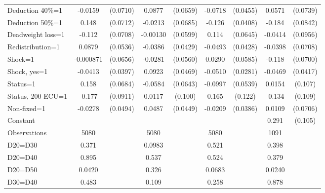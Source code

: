\begin{tabular}{l|cccccc|cc}
Deduction 40\%=1&  -0.0159         & (0.0710)&   0.0877         & (0.0659)&  -0.0718         & (0.0455)&   0.0571         & (0.0739)\\
Deduction 50\%=1&    0.148\sym{**} & (0.0712)&  -0.0213         & (0.0685)&   -0.126\sym{***}& (0.0408)&   -0.184\sym{**} & (0.0842)\\
Deadweight loss=1&   -0.112         & (0.0708)& -0.00130         & (0.0599)&    0.114\sym{*}  & (0.0645)&  -0.0414         & (0.0956)\\
Redistribution=1&   0.0879         & (0.0536)&  -0.0386         & (0.0429)&  -0.0493         & (0.0428)&  -0.0398         & (0.0708)\\
Shock=1         &-0.000871         & (0.0656)&  -0.0281         & (0.0560)&   0.0290         & (0.0585)&   -0.118\sym{*}  & (0.0700)\\
Shock, yes=1    &  -0.0413         & (0.0397)&   0.0923\sym{**} & (0.0469)&  -0.0510\sym{*}  & (0.0281)&  -0.0469         & (0.0417)\\
Status=1        &    0.158\sym{**} & (0.0684)&  -0.0584         & (0.0643)&  -0.0997\sym{*}  & (0.0539)&   0.0154         &  (0.107)\\
Status, 200 ECU=1&   -0.177\sym{*}  & (0.0911)&   0.0117         &  (0.100)&    0.165         &  (0.122)&   -0.134         &  (0.109)\\
Non-fixed=1     &  -0.0278         & (0.0494)&   0.0487         & (0.0449)&  -0.0209         & (0.0386)&   0.0109         & (0.0706)\\
Constant        &                  &         &                  &         &                  &         &    0.291\sym{***}&  (0.105)\\
\hline
Observations    &     5080         &         &     5080         &         &     5080         &         &     1091         &         \\
D20=D30         &    0.371         &         &   0.0983         &         &    0.521         &         &    0.398         &         \\
D20=D40         &    0.895         &         &    0.537         &         &    0.524         &         &    0.379         &         \\
D20=D50         &   0.0420         &         &    0.326         &         &   0.0683         &         &   0.0240         &         \\
D30=D40         &    0.483         &         &    0.109         &         &    0.258         &         &    0.878         &         \\

\end{tabular}
